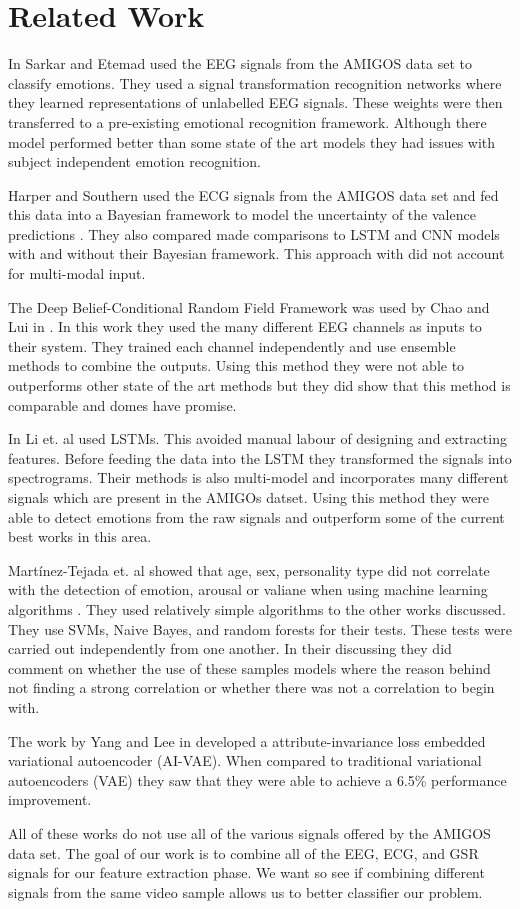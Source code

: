 \section{Related Work}
\label{sec:related_work}
In \cite{sarkar2020selfsupervised} Sarkar and Etemad
used the EEG signals from the AMIGOS data set to classify emotions.
They used a signal transformation recognition networks
where they learned representations of unlabelled EEG signals.
These weights were then transferred to a pre-existing emotional
recognition framework.
Although there model performed better than some state of the art models
they had issues with subject independent emotion recognition.

Harper and Southern used the ECG signals from the AMIGOS data set
and fed this data into a Bayesian framework to model
the uncertainty of the valence predictions \cite{Harper_2020}.
They also compared made comparisons to LSTM and CNN models with
and without their Bayesian framework.
This approach with did not account for multi-modal input.

The Deep Belief-Conditional Random Field Framework was used by
Chao and Lui in \cite{8999626}.
In this work they used the many different EEG channels as inputs to their system.
They trained each channel independently and use ensemble methods to combine the outputs.
Using this method they were not able to outperforms other state of the art methods
but they did show that this method is comparable and domes have promise.

In \cite{LI2020102185} Li et. al used LSTMs.
This avoided manual labour of designing and extracting features.
Before feeding the data into the LSTM they transformed the signals into spectrograms.
Their methods is also multi-model and incorporates many different signals which
are present in the AMIGOs datset.
Using this method they were able to detect emotions from the raw signals and outperform some of the current best works in this area.


Martínez-Tejada et. al showed that age, sex, personality type did not
correlate with the detection of emotion, arousal or valiane when using
machine learning algorithms \cite{Mart_nez_Tejada_2020}.
They used relatively simple algorithms to the other works discussed.
They use SVMs, Naive Bayes, and random forests for their tests.
These tests were carried out independently from one another.
In their discussing they did comment on whether the use of these
samples models where the reason behind not finding a strong correlation
or whether there was not a correlation to begin with.

The work by Yang and Lee in \cite{8683290}  developed
a attribute-invariance loss embedded variational autoencoder (AI-VAE).
When compared to traditional variational autoencoders (VAE)
they saw that they were able to achieve a 6.5\% performance improvement.

All of these works do not use all of the various signals offered by the AMIGOS data set.
The goal of our work is to combine all of the EEG, ECG, and GSR signals for our feature extraction phase.
We want so see if combining different signals from the same video sample
allows us to better classifier our problem.

